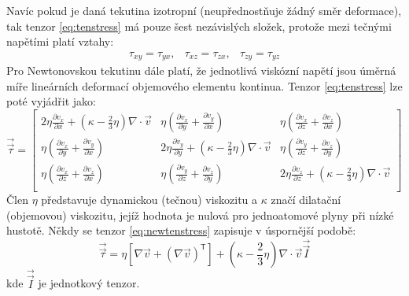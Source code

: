 \noindent  Navíc pokud je daná tekutina izotropní (neupřednostňuje žádný směr deformace), tak tenzor \ref{eq:tenstress} má pouze šest nezávislých složek, protože mezi tečnými napětími platí vztahy:
\begin{equation}
    \begin{array}{ccc}
      \tau_{xy} = \tau_{yx}, & \tau_{xz} = \tau_{zx}, & \tau_{zy} = \tau_{yz}
      \end{array}
  	\label{eq:dept}
\end{equation} 
Pro Newtonovskou tekutinu dále platí, že jednotlivá viskózní napětí jsou úměrná míře lineárních deformací objemového elementu kontinua. Tenzor \ref{eq:tenstress} lze poté vyjádřit jako: 
\begin{equation}
    \vec{\vec{\tau}} = 
    \begin{bmatrix}
      2\eta\frac{\partial v_{x}}{\partial x} + \left( \kappa - \frac{2}{3} \eta  \right)  \nabla \cdot \vec{v} & \eta \left( \frac{\partial v_{x}}{\partial y} + \frac{\partial v_{y}}{\partial x} \right) & \eta \left( \frac{\partial v_{x}}{\partial z} + \frac{\partial v_{z}}{\partial x} \right)\\ 
      \eta \left( \frac{\partial v_{x}}{\partial y} + \frac{\partial v_{y}}{\partial x} \right) & 2\eta\frac{\partial v_{y}}{\partial y} + \left( \kappa - \frac{2}{3} \eta  \right)  \nabla \cdot \vec{v} 
      & \eta \left( \frac{\partial v_{y}}{\partial z} + \frac{\partial v_{z}}{\partial y} \right)\\ 
      \eta \left( \frac{\partial v_{x}}{\partial z} + \frac{\partial v_{z}}{\partial x} \right) & \eta \left( \frac{\partial v_{y}}{\partial z} + \frac{\partial v_{z}}{\partial y} \right)
      & 2\eta\frac{\partial v_{z}}{\partial z} + \left( \kappa - \frac{2}{3} \eta  \right) \nabla \cdot \vec{v}\\ 
    \end{bmatrix}
  	\label{eq:newtenstress}
\end{equation} 
Člen $\eta$ představuje dynamickou (tečnou) viskozitu a $\kappa$ značí dilatační (objemovou) viskozitu, jejíž hodnota je nulová pro jednoatomové plyny při nízké hustotě. Někdy se tenzor \ref{eq:newtenstress} zapisuje v úspornější podobě:
\begin{equation}
	\vec{\vec{\tau}} = \eta \left[ \nabla \vec{v} +  \left( \nabla \vec{v} \right)^{\mathsf{T}}\right] +  \left( \kappa -\frac{2}{3} \eta \right) \nabla \cdot \vec{v} \vec{\vec{I}}
	\label{eq:comptenstress}
\end{equation}
kde $\vec{\vec{I}}$ je jednotkový tenzor.

